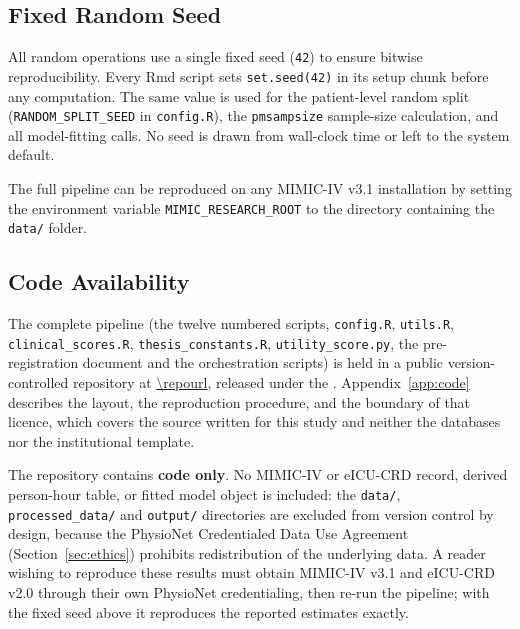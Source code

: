 \subsection{Fixed Random Seed}

All random operations use a single fixed seed (\texttt{42}) to ensure bitwise
reproducibility. Every Rmd script sets \texttt{set.seed(42)} in its setup
chunk before any computation. The same value is used for the patient-level
random split (\texttt{RANDOM\_SPLIT\_SEED} in \texttt{config.R}), the
\texttt{pmsampsize} sample-size calculation, and all model-fitting calls. No
seed is drawn from wall-clock time or left to the system default.

The full pipeline can be reproduced on any MIMIC-IV v3.1 installation by
setting the environment variable \texttt{MIMIC\_RESEARCH\_ROOT} to the
directory containing the \texttt{data/} folder.

\subsection{Code Availability}
\label{sec:code_availability}

The complete pipeline (the twelve numbered scripts, \texttt{config.R},
\texttt{utils.R}, \texttt{clinical\_scores.R}, \texttt{thesis\_constants.R},
\texttt{utility\_score.py}, the pre-registration document and the orchestration
scripts) is held in a public version-controlled repository at
\url{\repourl}, released under the \repolicence. Appendix~\ref{app:code}
describes the layout, the reproduction procedure, and the boundary of that
licence, which covers the source written for this study and neither the
databases nor the institutional template.

The repository contains \textbf{code only}. No MIMIC-IV or eICU-CRD record,
derived person-hour table, or fitted model object is included: the
\texttt{data/}, \texttt{processed\_data/} and \texttt{output/} directories are
excluded from version control by design, because the PhysioNet Credentialed
Data Use Agreement (Section~\ref{sec:ethics}) prohibits redistribution of the
underlying data. A reader wishing to reproduce these results must obtain
MIMIC-IV v3.1 and eICU-CRD v2.0 through their own PhysioNet credentialing, then
re-run the pipeline; with the fixed seed above it reproduces the reported
estimates exactly.
